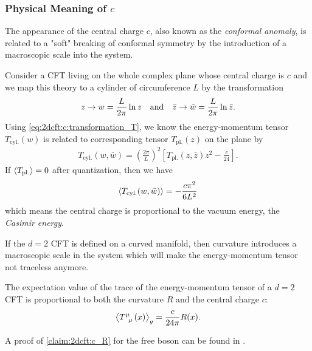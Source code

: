 \documentclass[10pt]{article}
\begin{document}
\subsubsection{Physical Meaning of \texorpdfstring{$c$}{c}}
\begin{intu}
    The appearance of the central charge $c$, also known as the \textit{conformal anomaly}, is related to a "soft" breaking of conformal symmetry by the introduction of a macroscopic scale into the system.
\end{intu}
\begin{example}
    Consider a CFT living on the whole complex plane whose central charge is $c$ and we map this theory to a cylinder of circumference $L$ by the transformation
    \begin{align}
        z\to w=\frac{L}{2\pi}\ln{z}\qand \bar{z}\to \bar{w}=\frac{L}{2\pi}\ln{\bar{z}}.
    \end{align}
    Using \cref{eq:2dcft:c:transformation_T}, we know the energy-momentum tensor $T_{\text{cyl.}}(w)$ is related to corresponding tensor $T_{\text{pl.}}(z)$ on the plane by
    \begin{align}
        T_{\text{cyl.}}(w,\bar{w})=\left(\frac{2\pi}{L}\right)^2\left[T_{\text{pl.}}(z,\bar{z})z^2-\frac{c}{24}\right].\label{eq:2dcft:c:transformation_T_cylinder}
    \end{align}
    If $\expval{T_{\text{pl.}}}=0$ after quantization, then we have
    \begin{align}
        \expval{T_{\text{cyl.}}(w,\bar{w})}=-\frac{c\pi^2}{6L^2}
    \end{align}
    which means the central charge is proportional to the vacuum energy, the \textit{Casimir energy}.
\end{example}

If the $d=2$ CFT is defined on a curved manifold, then curvature introduces a macroscopic scale in the system which will make the energy-momentum tensor not traceless anymore.
\begin{claim}\label{claim:2dcft:c_R}
    The expectation value of the trace of the energy-momentum tensor of a $d=2$ CFT is proportional to both the curvature $R$ and the central charge $c$:\snm
    \begin{align}
        \expval{\tensor{T}{^\mu_\mu}(x)}_g=\frac{c}{24\pi}R(x).
    \end{align}
\end{claim}
A proof of \cref{claim:2dcft:c_R} for the free boson can be found in \cite[Appendix 5.A]{DiFrancesco:1997nk}.
\clearpage
\end{document}
